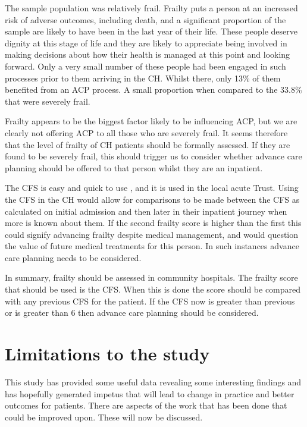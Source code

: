 \documentclass
[
	12pt,
	a4paper,
	oneside,
]{report}
\begin{document}
The sample population was relatively frail. Frailty puts a person at an 
increased risk of adverse outcomes, including death, and a significant
proportion of the sample are likely to have been in the last year of their life.
These people deserve dignity at this stage of life and they are likely
to appreciate being involved in making decisions about how their health is
managed at this point and looking forward. Only a very small number of these 
people had been engaged in such processes prior to them arriving in the CH.
Whilst there, only 13\% of them benefited from an ACP process. A small 
proportion when compared to the 33.8\% that were severely frail.

Frailty 
appears to be the biggest factor likely to be influencing ACP, but we are 
clearly
not offering ACP to all those who are severely frail. It seems therefore that
the level of frailty of CH patients should be formally assessed. If they 
are found 
to be severely frail, this should trigger us to consider whether advance 
care planning should be offered to that person whilst they are an inpatient.

The CFS is easy and quick to use \parencite{elliott:17}, and it is used in the 
local acute Trust. 
Using the CFS in the CH would allow for comparisons to be made between the CFS 
as calculated on initial admission and then later in their inpatient journey
when more is known about them. If the second frailty score is higher than the
first this could signify advancing frailty despite medical management, 
and would question the value of future medical treatments for this person.
In such instances advance care planning needs to be considered. 

In summary, frailty should be assessed in community hospitals. The frailty score
that should be used is the CFS. When this is done the score should be compared
with any previous CFS for the patient. If the CFS now is greater than previous
or is greater than 6 then advance care planning should be considered.

\section{Limitations to the study}

This study has provided some useful data revealing some interesting findings
and has hopefully generated impetus that will lead to change in practice and
better outcomes for patients. There are aspects of the work that has been done
that could be improved upon. These will now be discussed.
\end{document}
